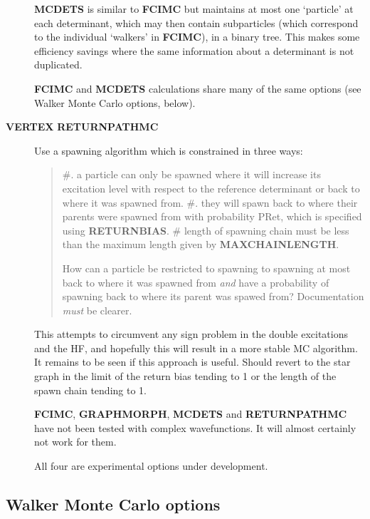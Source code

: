 \documentclass[openany,a4paper,10pt]{manual}
\begin{document}
\begin{description}
\textbf{MCDETS} is similar to \textbf{FCIMC} but maintains at most one
`particle' at each determinant, which may then contain subparticles
(which correspond to the individual `walkers' in \textbf{FCIMC}), in
a binary tree.  This makes some efficiency savings where the same
information about a determinant is not duplicated.

\textbf{FCIMC} and \textbf{MCDETS} calculations share many of the same options
(see Walker Monte Carlo options, below).

\item[\textbf{VERTEX} \textbf{RETURNPATHMC}]
Use a spawning algorithm which is constrained in three ways:
\begin{quote}

\#.  a particle can only be spawned where it will increase its
excitation level with respect to the reference determinant or
back to where it was spawned from.
\#. they will spawn back to where their parents were spawned from
with probability PRet, which is specified using \textbf{RETURNBIAS}.
\# length of spawning chain must be less than the maximum length
given by \textbf{MAXCHAINLENGTH}.

\begin{notice}[note]
How can a particle be restricted to spawning to spawning at most
back to where it was spawned from \emph{and} have a probability of
spawning back to where its parent was spawed from?
Documentation \emph{must} be clearer.
\end{notice}
\end{quote}

This attempts to circumvent any sign problem in the double
excitations and the HF, and hopefully this will result in a more stable
MC algorithm. It remains to be seen if this approach is useful.  Should
revert to the star graph in the limit of the return bias tending to 1 or
the length of the spawn chain tending to 1.

\begin{notice}[note]
\textbf{FCIMC}, \textbf{GRAPHMORPH}, \textbf{MCDETS} and \textbf{RETURNPATHMC} have not
been tested with complex wavefunctions.  It will almost certainly
not work for them.

All four are experimental options under development.
\end{notice}

\end{description}


\subsection{Walker Monte Carlo options}
\end{document}
